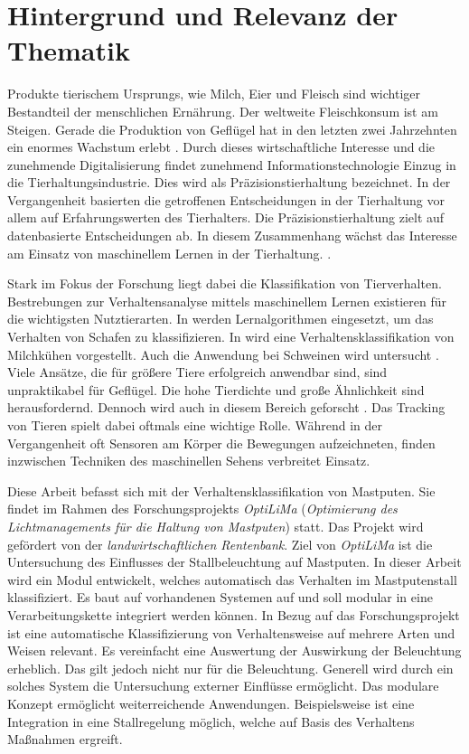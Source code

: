 \section{Hintergrund und Relevanz der Thematik}
Produkte tierischem Ursprungs, wie Milch, Eier und Fleisch sind wichtiger Bestandteil der menschlichen Ernährung. Der weltweite Fleischkonsum ist am Steigen. Gerade die Produktion von Geflügel hat in den letzten zwei Jahrzehnten ein enormes Wachstum erlebt \cite{StatistischesBundesamt.20200212}. Durch dieses wirtschaftliche Interesse und die zunehmende Digitalisierung findet zunehmend Informationstechnologie Einzug in die Tierhaltungsindustrie. Dies wird als Präzisionstierhaltung bezeichnet. In der Vergangenheit basierten die getroffenen Entscheidungen in der Tierhaltung vor allem auf Erfahrungswerten des Tierhalters. Die Präzisionstierhaltung zielt auf datenbasierte Entscheidungen ab. In diesem Zusammenhang wächst das Interesse am Einsatz von maschinellem Lernen in der Tierhaltung. \cite{Garcia.2020}.\par

Stark im Fokus der Forschung liegt dabei die Klassifikation von Tierverhalten. Bestrebungen zur Verhaltensanalyse mittels maschinellem Lernen existieren für die wichtigsten Nutztierarten. In \cite{VazquezDiosdado.2019} werden Lernalgorithmen eingesetzt, um das Verhalten von Schafen zu klassifizieren. In \cite{VazquezDiosdado.2015} wird eine Verhaltensklassifikation von Milchkühen vorgestellt. Auch die Anwendung bei Schweinen wird untersucht \cite{Tran.2023}. Viele Ansätze, die für größere Tiere erfolgreich anwendbar sind, sind unpraktikabel für Geflügel. Die hohe Tierdichte und große Ähnlichkeit sind herausfordernd. Dennoch wird auch in diesem Bereich geforscht \cite{Chen.2023, Gonzalez.2020, Nasirahmadi.2020}. Das Tracking von Tieren spielt dabei oftmals eine wichtige Rolle. Während in der Vergangenheit oft Sensoren am Körper die Bewegungen aufzeichneten, finden inzwischen Techniken des maschinellen Sehens verbreitet Einsatz.\par

Diese Arbeit befasst sich mit der Verhaltensklassifikation von Mastputen. Sie findet im Rahmen des Forschungsprojekts \textit{\acrshort{OptiLiMa}} (\textit{Optimierung des Lichtmanagements für die Haltung von Mastputen}) statt. Das Projekt wird gefördert von der \textit{landwirtschaftlichen Rentenbank}. Ziel von \textit{\acrshort{OptiLiMa}} ist die Untersuchung des Einflusses der Stallbeleuchtung auf Mastputen. In dieser Arbeit wird ein Modul entwickelt, welches automatisch das Verhalten im Mastputenstall klassifiziert. Es baut auf vorhandenen Systemen auf und soll modular in eine Verarbeitungskette integriert werden können. In Bezug auf das Forschungsprojekt ist eine automatische Klassifizierung von Verhaltensweise auf mehrere Arten und Weisen relevant. Es vereinfacht eine Auswertung der Auswirkung der Beleuchtung erheblich. Das gilt jedoch nicht nur für die Beleuchtung. Generell wird durch ein solches System die Untersuchung externer Einflüsse ermöglicht. Das modulare Konzept ermöglicht weiterreichende Anwendungen. Beispielsweise ist eine Integration in eine Stallregelung möglich, welche auf Basis des Verhaltens Maßnahmen ergreift.\par

